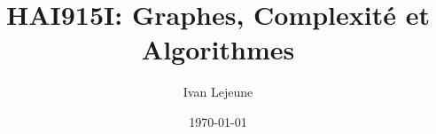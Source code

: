 
% 






\title{\color{astral} \sffamily \bfseries HAI915I: Graphes, Complexité et Algorithmes}
\author{Ivan Lejeune}
\date{\today}
\toggletrue{showsolutions}


    \maketitle
    \tableofcontents

    \newpage
    
    



